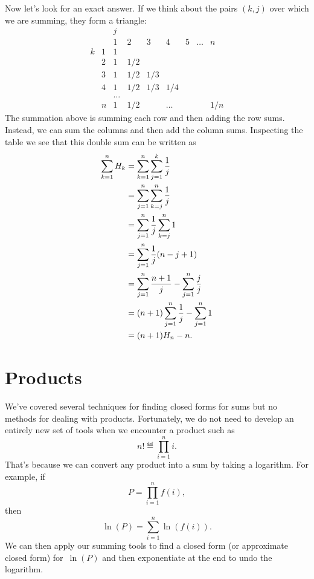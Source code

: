 Now let's look for an exact answer.  If we think about the pairs
$(k,j)$ over which we are summing, they form a triangle:
\[
\begin{array}{cc|ccccccc}
 &  & j &   &   &   &   &       &   \\
 &  & 1 & 2 & 3 & 4 & 5 & \dots & n \\
\hline
k & 1 & 1\\
  & 2 &1&1/2\\
  & 3 &1&1/2&1/3\\
  & 4 &1&1/2&1/3&1/4\\
  &   &\dots\\
  & n &1&1/2&&\dots&&&1/n
\end{array}
\]
The summation above is summing each row and then adding the row sums.
Instead, we can sum the columns and then add the column sums.
Inspecting the table we see that this double sum can be written as
\begin{align}
\sum_{k=1}^n H_k &= \sum_{k=1}^n \sum_{j=1}^k \frac{1}{j}\notag\\
&= \sum_{j=1}^n \sum_{k=j}^n \frac{1}{j}\notag\\
&= \sum_{j=1}^n \frac{1}{j} \sum_{k=j}^n 1\notag\\
&= \sum_{j=1}^n \frac1j (n-j+1)\notag\\
&= \sum_{j=1}^n \frac{n+1}j - \sum_{j=1}^n \frac{j}{j}\notag\\
&= (n+1)\sum_{j=1}^n \frac1j - \sum_{j=1}^n 1\notag\\
&= (n+1)H_n-n.\label{sHk}
\end{align}

\section{Products}

We've covered several techniques for finding closed forms for sums but
no methods for dealing with products.  Fortunately, we do not need to
develop an entirely new set of tools when we encounter a product such
as
\begin{equation}\label{eqn:9P1}
    n! \eqdef \prod_{i = 1}^n i.
\end{equation}
That's because we can convert any product into a sum by taking a
logarithm.  For example, if
\begin{equation*}
    P = \prod_{i  = 1}^n f(i),
\end{equation*}
then
\begin{equation*}
    \ln(P) = \sum_{i = 1}^n \ln(f(i)).
\end{equation*}
We can then apply our summing tools to find a closed form (or
approximate closed form) for~$\ln(P)$ and then exponentiate at the end
to undo the logarithm.

